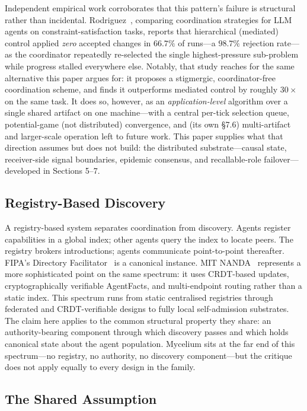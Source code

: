 \documentclass[11pt]{article}
\begin{document}
Independent empirical work corroborates that this pattern's failure is structural
rather than incidental. Rodriguez~\cite{pressure-fields-decay}, comparing
coordination strategies for LLM agents on constraint-satisfaction tasks, reports
that hierarchical (mediated) control applied \emph{zero} accepted changes in
$66.7\%$ of runs---a $98.7\%$ rejection rate---as the coordinator repeatedly
re-selected the single highest-pressure sub-problem while progress stalled
everywhere else. Notably, that study reaches for the same alternative this paper
argues for: it proposes a stigmergic, coordinator-free coordination scheme, and
finds it outperforms mediated control by roughly $30\times$ on the same task. It
does so, however, as an \emph{application-level} algorithm over a single shared
artifact on one machine---with a central per-tick selection queue, potential-game
(not distributed) convergence, and (its own §7.6) multi-artifact and larger-scale
operation left to future work. This paper supplies what that direction assumes but
does not build: the distributed substrate---causal state, receiver-side signal
boundaries, epidemic consensus, and recallable-role failover---developed in
Sections 5--7.

\subsection{Registry-Based Discovery}

A registry-based system separates coordination from discovery. Agents register
capabilities in a global index; other agents query the index to locate peers. The
registry brokers introductions; agents communicate point-to-point thereafter.
FIPA's Directory Facilitator~\cite{fipa,jade} is a canonical instance. MIT
NANDA~\cite{nanda} represents a more sophisticated point on the same spectrum:
it uses CRDT-based updates, cryptographically verifiable AgentFacts, and
multi-endpoint routing rather than a static index. This spectrum runs from
static centralised registries through federated and CRDT-verifiable designs to
fully local self-admission substrates. The claim here applies to the common
structural property they share: an authority-bearing component through which
discovery passes and which holds canonical state about the agent population.
Mycelium sits at the far end of this spectrum---no registry, no authority, no
discovery component---but the critique does not apply equally to every design
in the family.

\subsection{The Shared Assumption}
\end{document}
